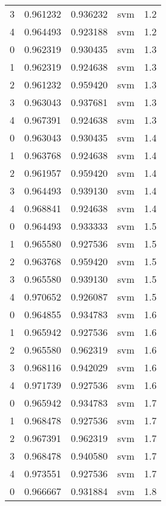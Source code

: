 \begin{tabular}{rrrlr}
     3 & 0.961232 & 0.936232 &      svm &        1.2 \\
     4 & 0.964493 & 0.923188 &      svm &        1.2 \\
     0 & 0.962319 & 0.930435 &      svm &        1.3 \\
     1 & 0.962319 & 0.924638 &      svm &        1.3 \\
     2 & 0.961232 & 0.959420 &      svm &        1.3 \\
     3 & 0.963043 & 0.937681 &      svm &        1.3 \\
     4 & 0.967391 & 0.924638 &      svm &        1.3 \\
     0 & 0.963043 & 0.930435 &      svm &        1.4 \\
     1 & 0.963768 & 0.924638 &      svm &        1.4 \\
     2 & 0.961957 & 0.959420 &      svm &        1.4 \\
     3 & 0.964493 & 0.939130 &      svm &        1.4 \\
     4 & 0.968841 & 0.924638 &      svm &        1.4 \\
     0 & 0.964493 & 0.933333 &      svm &        1.5 \\
     1 & 0.965580 & 0.927536 &      svm &        1.5 \\
     2 & 0.963768 & 0.959420 &      svm &        1.5 \\
     3 & 0.965580 & 0.939130 &      svm &        1.5 \\
     4 & 0.970652 & 0.926087 &      svm &        1.5 \\
     0 & 0.964855 & 0.934783 &      svm &        1.6 \\
     1 & 0.965942 & 0.927536 &      svm &        1.6 \\
     2 & 0.965580 & 0.962319 &      svm &        1.6 \\
     3 & 0.968116 & 0.942029 &      svm &        1.6 \\
     4 & 0.971739 & 0.927536 &      svm &        1.6 \\
     0 & 0.965942 & 0.934783 &      svm &        1.7 \\
     1 & 0.968478 & 0.927536 &      svm &        1.7 \\
     2 & 0.967391 & 0.962319 &      svm &        1.7 \\
     3 & 0.968478 & 0.940580 &      svm &        1.7 \\
     4 & 0.973551 & 0.927536 &      svm &        1.7 \\
     0 & 0.966667 & 0.931884 &      svm &        1.8 \\

\end{tabular}
